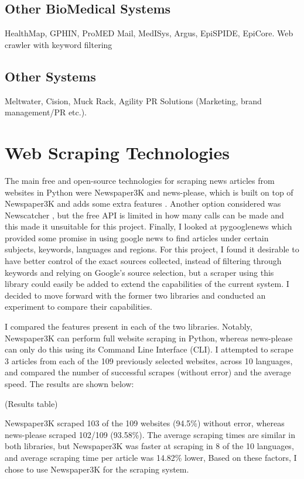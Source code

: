 \documentclass{l4proj}
\begin{document}
\subsection*{Other BioMedical Systems}
HealthMap, GPHIN, ProMED Mail, MedISys, Argus, EpiSPIDE, EpiCore.
Web crawler with keyword filtering \citep{zhang2009automatic}
\subsection*{Other Systems}
Meltwater, Cision, Muck Rack, Agility PR Solutions (Marketing, brand management/PR etc.).


\section{Web Scraping Technologies}
The main free and open-source technologies for scraping news articles from websites in Python were Newspaper3K and news-please, which is built on top of Newspaper3K and adds some extra features \citep{newspaper3k, news-please}. Another option considered was Newscatcher \citep{newscatcher}, but the free API is limited in how many calls can be made and this made it unsuitable for this project. Finally, I looked at pygooglenews \citep{pygooglenews} which provided some promise in using google news to find articles under certain subjects, keywords, languages and regions. For this project, I found it desirable to have better control of the exact sources collected, instead of filtering through keywords and relying on Google's source selection, but a scraper using this library could easily be added to extend the capabilities of the current system. I decided to move forward with the former two libraries and conducted an experiment to compare their capabilities. \par

I compared the features present in each of the two libraries. Notably, Newspaper3K can perform full website scraping in Python, whereas news-please can only do this using its Command Line Interface (CLI). I attempted to scrape 3 articles from each of the 109 previously selected websites, across 10 languages, and compared the number of successful scrapes (without error) and the average speed. The results are shown below: \par 
(Results table) \par
Newspaper3K scraped 103 of the 109 websites (94.5\%) without error, whereas news-please scraped 102/109 (93.58\%). The average scraping times are similar in both libraries, but Newspaper3K was faster at scraping in 8 of the 10 languages, and average scraping time per article was 14.82\% lower, Based on these factors, I chose to use Newspaper3K for the scraping system.
\end{document}
